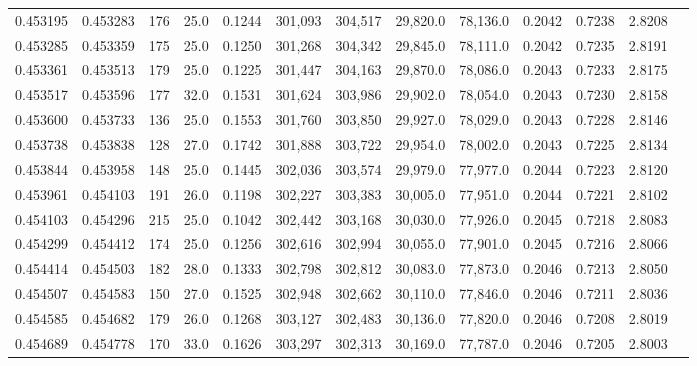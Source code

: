 \begin{tabular}{rrrrrrrrrrrrr}
0.453195 & 0.453283 &   176 & 25.0 &                                     0.1244 & 301,093 & 304,517 &  29,820.0 &  78,136.0 & 0.2042 & 0.7238 & 2.8208 \\
0.453285 & 0.453359 &   175 & 25.0 &                                     0.1250 & 301,268 & 304,342 &  29,845.0 &  78,111.0 & 0.2042 & 0.7235 & 2.8191 \\
0.453361 & 0.453513 &   179 & 25.0 &                                     0.1225 & 301,447 & 304,163 &  29,870.0 &  78,086.0 & 0.2043 & 0.7233 & 2.8175 \\
0.453517 & 0.453596 &   177 & 32.0 &                                     0.1531 & 301,624 & 303,986 &  29,902.0 &  78,054.0 & 0.2043 & 0.7230 & 2.8158 \\
0.453600 & 0.453733 &   136 & 25.0 &                                     0.1553 & 301,760 & 303,850 &  29,927.0 &  78,029.0 & 0.2043 & 0.7228 & 2.8146 \\
0.453738 & 0.453838 &   128 & 27.0 &                                     0.1742 & 301,888 & 303,722 &  29,954.0 &  78,002.0 & 0.2043 & 0.7225 & 2.8134 \\
0.453844 & 0.453958 &   148 & 25.0 &                                     0.1445 & 302,036 & 303,574 &  29,979.0 &  77,977.0 & 0.2044 & 0.7223 & 2.8120 \\
0.453961 & 0.454103 &   191 & 26.0 &                                     0.1198 & 302,227 & 303,383 &  30,005.0 &  77,951.0 & 0.2044 & 0.7221 & 2.8102 \\
0.454103 & 0.454296 &   215 & 25.0 &                                     0.1042 & 302,442 & 303,168 &  30,030.0 &  77,926.0 & 0.2045 & 0.7218 & 2.8083 \\
0.454299 & 0.454412 &   174 & 25.0 &                                     0.1256 & 302,616 & 302,994 &  30,055.0 &  77,901.0 & 0.2045 & 0.7216 & 2.8066 \\
0.454414 & 0.454503 &   182 & 28.0 &                                     0.1333 & 302,798 & 302,812 &  30,083.0 &  77,873.0 & 0.2046 & 0.7213 & 2.8050 \\
0.454507 & 0.454583 &   150 & 27.0 &                                     0.1525 & 302,948 & 302,662 &  30,110.0 &  77,846.0 & 0.2046 & 0.7211 & 2.8036 \\
0.454585 & 0.454682 &   179 & 26.0 &                                     0.1268 & 303,127 & 302,483 &  30,136.0 &  77,820.0 & 0.2046 & 0.7208 & 2.8019 \\
0.454689 & 0.454778 &   170 & 33.0 &                                     0.1626 & 303,297 & 302,313 &  30,169.0 &  77,787.0 & 0.2046 & 0.7205 & 2.8003 \\

\end{tabular}
